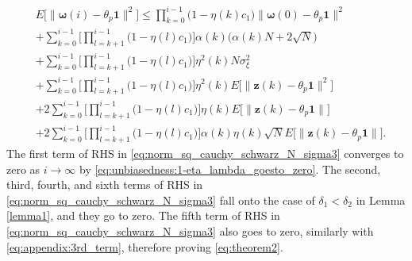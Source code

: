 \documentclass[journal]{IEEEtran}
\begin{document}
\vspace{-4mm}
\small
\begin{align}
&E\Big[\big\| \bm{\omega}(i) - \theta_p \mathbf{1}\big\|^2\Big] \le \prod_{k=0}^{i-1} \Big(1-\eta(k)c_1\Big) \big\|\bm{\omega}(0)-\theta_p\mathbf{1}\big\|^2 \nonumber \\
&+\sum_{k=0}^{i-1} \Bigg[\prod_{l=k+1}^{i-1}\Big(1-\eta(l)c_1\Big)\Bigg]\alpha(k)\Big(\alpha(k)N + 2\sqrt{N}\Big) \nonumber \\
&+\sum_{k=0}^{i-1} \Bigg[\prod_{l=k+1}^{i-1}\Big(1-\eta(l)c_1\Big)\Bigg]\eta^2(k)N\sigma_\xi^2 \nonumber \\
&+\sum_{k=0}^{i-1} \Bigg[\prod_{l=k+1}^{i-1}\Big(1-\eta(l)c_1\Big)\Bigg] \eta^2(k)E\Big[\big\|\mathbf{z}(k) - \theta_p\mathbf{1}\big\|^2\Big] \nonumber \\
&+2\sum_{k=0}^{i-1} \Bigg[\prod_{l=k+1}^{i-1}\Big(1-\eta(l)c_1\Big)\Bigg] \eta(k) E\Big[\big\|\mathbf{z}(k)- {\theta_p}\mathbf{1}\big\| \Big]  \nonumber \\
&+2\sum_{k=0}^{i-1} \Bigg[\prod_{l=k+1}^{i-1}\Big(1-\eta(l)c_1\Big)\Bigg] \alpha(k)\eta(k)\sqrt{N} E\Big[ \big\|\mathbf{z}(k)- {\theta_p}\mathbf{1} \big\| \Big]. \label{eq:norm_sq_cauchy_schwarz_N_sigma3}
\end{align} 
\normalsize
The first term of RHS in \eqref{eq:norm_sq_cauchy_schwarz_N_sigma3} converges to zero as $i \to \infty$ by \eqref{eq:unbiasedness:1-eta_lambda_goesto_zero}. The second, third, fourth, and sixth terms of RHS in \eqref{eq:norm_sq_cauchy_schwarz_N_sigma3} fall onto the case of $\delta_1 < \delta_2$ in Lemma \ref{lemma1}, and they go to zero. {}{The fifth term of RHS in \eqref{eq:norm_sq_cauchy_schwarz_N_sigma3} also goes to zero, similarly with \eqref{eq:appendix:3rd_term}, therefore proving \eqref{eq:theorem2}. }

%
\end{document}
